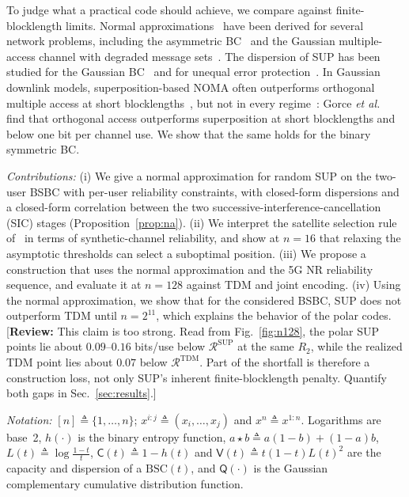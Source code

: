 \documentclass[conference]{IEEEtran}
\newcommand{\Vsf}{\mathsf{V}}
\newcommand{\Csf}{\mathsf{C}}
\newcommand{\Rs}{\mathcal{R}}
\newcommand{\BSC}{\mathrm{BSC}}
\newcommand{\reviewnote}[1]{{\color{red}\footnotesize[\textbf{Review:} #1]}}
\begin{document}
To judge what a practical code should achieve, we compare against finite-blocklength limits. Normal approximations~\cite{polyanskiy:TIT2010} have been derived for several network problems, including the asymmetric BC~\cite{Tan+Kosut} and the Gaussian multiple-access channel with degraded message sets~\cite{7289421ScarlettTanMACdegmsgset}. The dispersion of SUP has been studied for the Gaussian BC~\cite{unsal2017dispersion,wu2026dispersion,tuninetti2022second,9929397} and for unequal error protection~\cite{10622544}. In Gaussian downlink models, superposition-based NOMA often outperforms orthogonal multiple access at short blocklengths~\cite{sun2018shortpacket}, but not in every regime~\cite{amjad2020noma}: Gorce \emph{et al.}~\cite{gorce2021noma} find that orthogonal access outperforms superposition at short blocklengths and below one bit per channel use. We show that the same holds for the binary symmetric BC.

\emph{Contributions:} (i) We give a normal approximation for random SUP on the two-user BSBC with per-user reliability constraints, with closed-form dispersions and a closed-form correlation between the two successive-interference-cancellation (SIC) stages (Proposition~\ref{prop:na}). (ii) We interpret the satellite selection rule of~\cite{6975233} in terms of synthetic-channel reliability, and show at $n=16$ that relaxing the asymptotic thresholds can select a suboptimal position. (iii) We propose a construction that uses the normal approximation and the 5G NR reliability sequence, and evaluate it at $n=128$ against TDM and joint encoding. (iv) Using the normal approximation, we show that for the considered BSBC, SUP does not outperform TDM until $n=2^{11}$, which explains the behavior of the polar codes. \reviewnote{This claim is too strong. Read from Fig.~\ref{fig:n128}, the polar SUP points lie about $0.09$--$0.16$ bits/use below $\Rs^{\mathrm{SUP}}$ at the same $R_2$, while the realized TDM point lies about $0.07$ below $\Rs^{\mathrm{TDM}}$. Part of the shortfall is therefore a construction loss, not only SUP's inherent finite-blocklength penalty. Quantify both gaps in Sec.~\ref{sec:results}.}

\emph{Notation:} $[n]\triangleq\{1,\dots,n\}$; $x^{i:j}\triangleq(x_i,\dots,x_j)$ and $x^n\triangleq x^{1:n}$. Logarithms are base~2, $h(\cdot)$ is the binary entropy function, $a\star b\triangleq a(1-b)+(1-a)b$, $L(t)\triangleq\log\frac{1-t}{t}$, $\Csf(t)\triangleq 1-h(t)$ and $\Vsf(t)\triangleq t(1-t)L(t)^2$ are the capacity and dispersion of a $\BSC(t)$, and $\mathsf{Q}(\cdot)$ is the Gaussian complementary cumulative distribution function.
\end{document}

